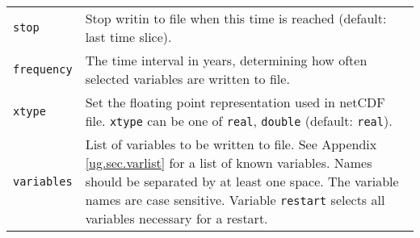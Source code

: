 \begin{center}
\begin{supertabular*}{\textwidth}{@{\extracolsep{\fill}}|l|p{11cm}|}
    \texttt{stop} & Stop writin to file when this time is reached (default: last time slice). \\
    \texttt{frequency} & The time interval in years, determining how often selected variables are written to file.\\
    \texttt{xtype} & Set the floating point representation used in netCDF file. \texttt{xtype} can be one of \texttt{real}, \texttt{double} (default: \texttt{real}). \\
    \texttt{variables} & List of variables to be written to file. See Appendix \ref{ug.sec.varlist} for a list of known variables. Names should be separated by at least one space. The variable names are case sensitive. Variable \texttt{restart} selects all variables necessary for a restart.\\
    \hline
  \end{supertabular*}
\end{center}
